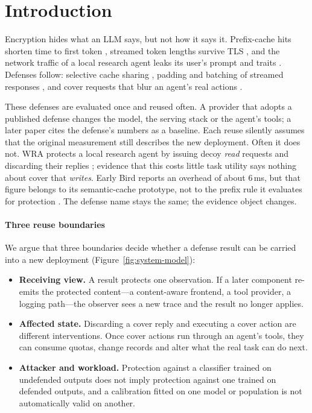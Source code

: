 \section{Introduction}\label{sec:introduction}
Encryption hides what an LLM says, but not how it says it. Prefix-cache hits shorten time to first token \cite{earlybird2025,promptpeek2025}, streamed token lengths survive TLS \cite{whisperleak2025,netecho2025}, and the network traffic of a local research agent leaks its user's prompt and traits \cite{jeong2026wra}. Defenses follow: selective cache sharing \cite{wu2026cacheprune}, padding and batching of streamed responses \cite{whisperleak2025,netecho2025}, and cover requests that blur an agent's real actions \cite{jeong2026wra}.

These defenses are evaluated once and reused often. A provider that adopts a published defense changes the model, the serving stack or the agent's tools; a later paper cites the defense's numbers as a baseline. Each reuse silently assumes that the original measurement still describes the new deployment. Often it does not. WRA protects a local research agent by issuing decoy \emph{read} requests and discarding their replies \cite{jeong2026wra}; evidence that this costs little task utility says nothing about cover that \emph{writes}. Early Bird reports an overhead of about 6\,ms, but that figure belongs to its semantic-cache prototype, not to the prefix rule it evaluates for protection \cite[V-A--B]{earlybird2025}. The defense name stays the same; the evidence object changes.

\paragraph{Three reuse boundaries}
We argue that three boundaries decide whether a defense result can be carried into a new deployment (Figure~\ref{fig:system-model}):
\begin{itemize}
\item \textbf{Receiving view.} A result protects one observation. If a later component re-emits the protected content---a content-aware frontend, a tool provider, a logging path---the observer sees a new trace and the result no longer applies.
\item \textbf{Affected state.} Discarding a cover reply and executing a cover action are different interventions. Once cover actions run through an agent's tools, they can consume quotas, change records and alter what the real task can do next.
\item \textbf{Attacker and workload.} Protection against a classifier trained on undefended outputs does not imply protection against one trained on defended outputs, and a calibration fitted on one model or population is not automatically valid on another.
\end{itemize}

